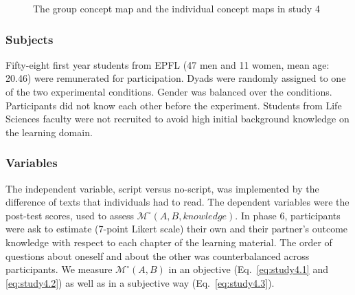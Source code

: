 \documentclass[natbib]{svjour3}
\newcommand{\Model}[3]{{$\mathcal{M}^{\circ}(#1, #2, #3)$}}
\newcommand{\gModel}[2]{{$\mathcal{M}^{\circ}(#1, #2)$}}
\begin{document}
\begin{figure}
    \centering
    \caption{The group concept map and the individual concept maps in study
    4}
    \label{study4:concept_map}
\end{figure}

\subsubsection*{Subjects}

Fifty-eight first year students from EPFL (47 men and 11 women, mean age: 20.46)
were remunerated for participation. Dyads were randomly assigned to one of the
two experimental conditions. Gender was balanced over the conditions.
Participants did not know each other before the experiment. Students from Life
Sciences faculty were not recruited to avoid high initial background knowledge on the
learning domain.

\subsubsection*{Variables}

The independent variable, script versus no-script, was implemented by the
difference of texts that individuals had to read.  The dependent variables were
the post-test scores, used to assess \Model{A}{B}{knowledge}. In phase 6,
participants were ask to estimate (7-point Likert scale) their own and their
partner's outcome knowledge with respect to each chapter of the learning
material. The order of questions about oneself and about the other was
counterbalanced across participants. We measure \gModel{A}{B} in an objective
(Eq.~\ref{eq:study4.1} and \ref{eq:study4.2}) as well as in a subjective way
(Eq.~\ref{eq:study4.3}).
\end{document}
